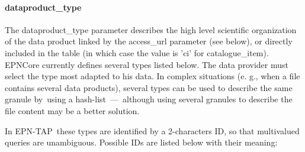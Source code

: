 \documentclass[11pt,a4paper]{ivoa}
\begin{document}
\paragraph{dataproduct\_type}

The dataproduct\_type parameter describes the high level scientific organization of the data product linked by the access\_url parameter (see below), or directly included in the table (in which case the value is 'ci' for catalogue\_item). EPNCore currently defines several types listed below. The data provider must select the type most adapted to his data. In complex situations (e. g., when a file contains several data products), several types can be used to describe the same granule by using a hash-list — although using several granules to describe the file content may be a better solution.  

In EPN-TAP these types are identified by a 2-characters ID, so that multivalued queries are unambiguous. Possible IDs are listed below with their meaning:
\end{document}
